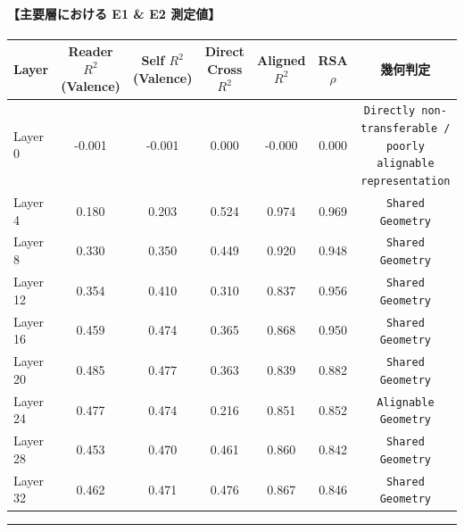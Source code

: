 \paragraph{【主要層における E1 \& E2 測定値】}
\begin{center}
\small
\begin{tabular}{lcccccc}
\toprule
\textbf{Layer} & \textbf{Reader $R^2$ (Valence)} & \textbf{Self $R^2$ (Valence)} & \textbf{Direct Cross $R^2$} & \textbf{Aligned $R^2$} & \textbf{RSA $\rho$} & \textbf{幾何判定} \\
\midrule
Layer  0 & -0.001 & -0.001 & 0.000 & -0.000 & 0.000 & \texttt{Directly non-transferable / poorly alignable representation} \\
Layer  4 & 0.180 & 0.203 & 0.524 & 0.974 & 0.969 & \texttt{Shared Geometry} \\
Layer  8 & 0.330 & 0.350 & 0.449 & 0.920 & 0.948 & \texttt{Shared Geometry} \\
Layer 12 & 0.354 & 0.410 & 0.310 & 0.837 & 0.956 & \texttt{Shared Geometry} \\
Layer 16 & 0.459 & 0.474 & 0.365 & 0.868 & 0.950 & \texttt{Shared Geometry} \\
Layer 20 & 0.485 & 0.477 & 0.363 & 0.839 & 0.882 & \texttt{Shared Geometry} \\
Layer 24 & 0.477 & 0.474 & 0.216 & 0.851 & 0.852 & \texttt{Alignable Geometry} \\
Layer 28 & 0.453 & 0.470 & 0.461 & 0.860 & 0.842 & \texttt{Shared Geometry} \\
Layer 32 & 0.462 & 0.471 & 0.476 & 0.867 & 0.846 & \texttt{Shared Geometry} \\
\bottomrule
\end{tabular}
\end{center}



\vspace{0.5em}\hrule\vspace{0.5em}